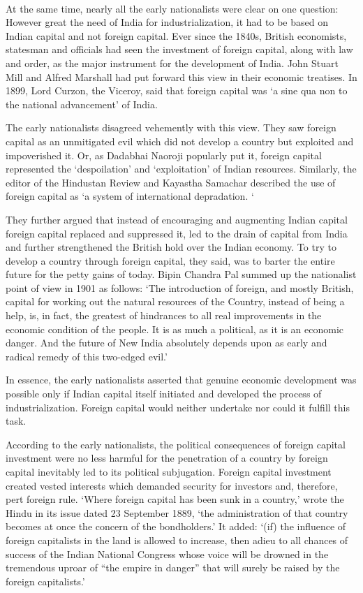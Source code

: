 \paragraph*{}

At the same time, nearly all the early nationalists were clear on one question: However great the need of India for industrialization, it had to be based on Indian capital and not foreign capital. Ever since the 1840s, British economists, statesman and officials had seen the investment of foreign capital, along with law and order, as the major instrument for the development of India. John Stuart Mill and Alfred Marshall had put forward this view in their economic treatises. In 1899, Lord Curzon, the Viceroy, said that foreign capital was `a sine qua non to the national advancement' of India.

The early nationalists disagreed vehemently with this view. They saw foreign capital as an unmitigated evil which did not develop a country but exploited and impoverished it. Or, as Dadabhai Naoroji popularly put it, foreign capital represented the `despoilation' and `exploitation' of Indian resources. Similarly, the editor of the Hindustan Review and Kayastha Samachar described the use of foreign capital as `a system of international depradation. `

They further argued that instead of encouraging and augmenting Indian capital foreign capital replaced and suppressed it, led to the drain of capital from India and further strengthened the British hold over the Indian economy. To try to develop a country through foreign capital, they said, was to barter the entire future for the petty gains of today. Bipin Chandra Pal summed up the nationalist point of view in 1901 as follows: `The introduction of foreign, and mostly British, capital for working out the natural resources of the Country, instead of being a help, is, in fact, the greatest of hindrances to all real improvements in the economic condition of the people. It is as much a political, as it is an economic danger. And the future of New India absolutely depends upon as early and radical remedy of this two-edged evil.'

In essence, the early nationalists asserted that genuine economic development was possible only if Indian capital itself initiated and developed the process of industrialization. Foreign capital would neither undertake nor could it fulfill this task.

According to the early nationalists, the political consequences of foreign capital investment were no less harmful for the penetration of a country by foreign capital inevitably led to its political subjugation. Foreign capital investment created vested interests which demanded security for investors and, therefore, pert foreign rule. `Where foreign capital has been sunk in a country,' wrote the Hindu in its issue dated 23 September 1889, `the administration of that country becomes at once the concern of the bondholders.' It added: `(if) the influence of foreign capitalists in the land is allowed to increase, then adieu to all chances of success of the Indian National Congress whose voice will be drowned in the tremendous uproar of ``the empire in danger'' that will surely be raised by the foreign capitalists.'

